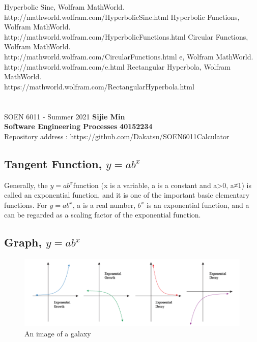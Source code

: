 \documentclass[letterpaper, 11pt]{report}
\begin{document}
\begin{thebibliography}{}
Hyperbolic Sine, Wolfram MathWorld.
\\http://mathworld.wolfram.com/HyperbolicSine.html
Hyperbolic Functions, Wolfram MathWorld.
\\http://mathworld.wolfram.com/HyperbolicFunctions.html
Circular Functions, Wolfram MathWorld.
\\http://mathworld.wolfram.com/CircularFunctions.html
e, Wolfram MathWorld.
\\http://mathworld.wolfram.com/e.html
Rectangular Hyperbola, Wolfram MathWorld.
\\https://mathworld.wolfram.com/RectangularHyperbola.html
\end{thebibliography}
\pagebreak

\section*{}
\normalsize {SOEN 6011 - Summer 2021} \hfill \textbf{Sijie Min} \\
\textbf{ Software Engineering Processes}  \hfill \textbf{40152234} \\
\hfill Repository address : https://github.com/Dakatsu/SOEN6011Calculator
\\
 \subsection*{ Tangent Function,  \(y=ab^x\) } Generally, the  \(y=ab^x\)function (x is a variable, a is a constant and a>0, a≠1) is called an exponential function, and it is one of the important basic elementary functions. For  \(y=ab^x\), a is a real number, \(b^x\) is an exponential function, and a can be regarded as a scaling factor of the exponential function.
\subsection*{ Graph,  \(y=ab^x\) } 
\begin{figure}[htp]
    \centering
    \includegraphics[width=16cm]{F5fig1}
    \caption{An image of a galaxy}
    \label{fig:galaxy}
\end{figure}
 \begin{center} 
\end{center}
\end{document}
